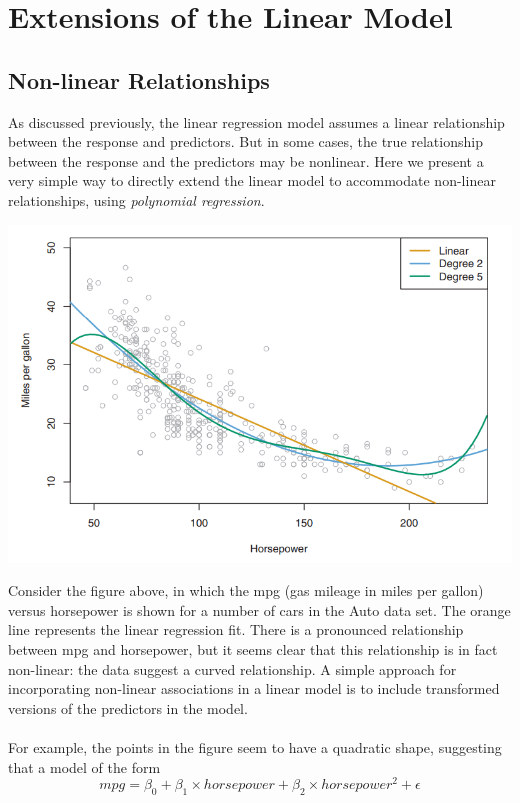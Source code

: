 \section{Extensions of the Linear Model}

\subsection{Non-linear Relationships}
As discussed previously, the linear regression model assumes a linear relationship between the response and predictors. But in some cases, the true relationship between the response and the predictors may be nonlinear. Here we present a very simple way to directly extend the linear model to accommodate non-linear relationships, using \textit{polynomial regression}.
\begin{center}
    \includegraphics[scale=0.8]{images/pol-reg.png}
\end{center}
Consider the figure above,  in which the mpg (gas mileage in miles per gallon) versus horsepower is shown for a number of cars in the Auto data set. The orange line represents the linear regression fit. There is a pronounced relationship between mpg and horsepower, but it seems clear that this relationship is in fact non-linear: the data suggest a curved relationship. A simple approach for incorporating non-linear associations in a linear model is to include transformed versions of the predictors in the model.\\\\
For example, the points in the figure seem to have a quadratic shape, suggesting that a model of the form
\[mpg = \beta_0 + \beta_1 \times horsepower + \beta_2 \times horsepower^2 + \epsilon\]
